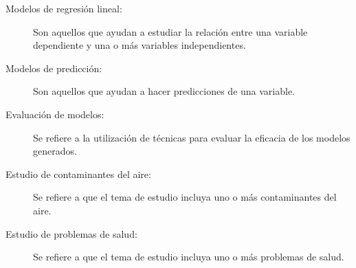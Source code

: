 \begin{description}
\item[Modelos de regresión lineal:]{Son aquellos que ayudan a estudiar la relación entre una variable dependiente y una o más variables independientes.}
\end{description}

\begin{description}
\item[Modelos de predicción:]{Son aquellos que ayudan a hacer predicciones de una variable.}
\end{description}

\begin{description}
\item[Evaluación de modelos:]{Se refiere a la utilización de técnicas para evaluar la eficacia de los modelos generados.}
\end{description}

\begin{description}
\item[Estudio de contaminantes del aire:]{Se refiere a que el tema de estudio incluya uno o más contaminantes del aire.}
\end{description}

\begin{description}
\item[Estudio de problemas de salud:]{Se refiere a que el tema de estudio incluya uno o más problemas de salud.}
\end{description}

